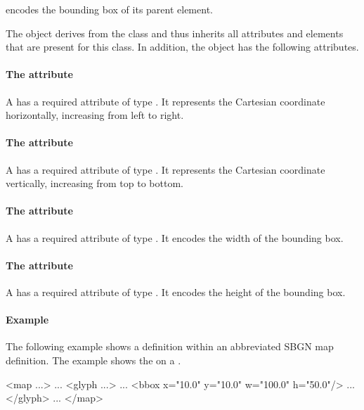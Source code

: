 \BBox encodes the bounding box of its parent element. 

The \BBox object derives from the \SbgnBase class and thus inherits all
attributes and elements that are present for this class.
In addition, the \BBox object has the following attributes.

\paragraph{The \fixttspace{} attribute}

A \BBox has a required attribute  of type . It represents the Cartesian  coordinate horizontally, increasing from left to right.


\paragraph{The \fixttspace{} attribute}

A \BBox has a required attribute  of type . It represents the Cartesian  coordinate vertically, increasing from top to bottom.


\paragraph{The \fixttspace{} attribute}

A \BBox has a required attribute  of type
. It encodes the width of the bounding box. 


\paragraph{The \fixttspace{} attribute}

A \BBox has a required attribute  of type
. It encodes the height of the bounding box. 

\paragraph{Example}

The following example shows a \BBox definition within an abbreviated SBGN map definition. The example shows the \BBox on a \Glyph.

\begin{example}
<map ...>
    ...
    <glyph ...>
        ...
        <bbox x="10.0" y="10.0" w="100.0" h="50.0"/>
        ...
    </glyph>
    ...
</map>
\end{example}


